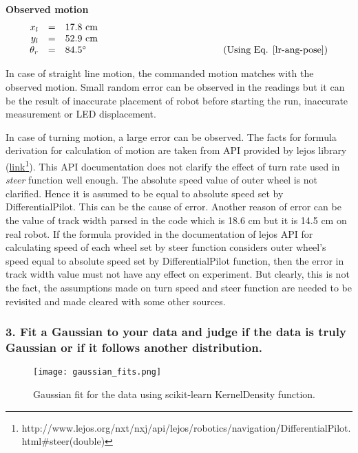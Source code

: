 \begin{enumerate}
	\textbf{Observed motion}
	\begin{equation}
	\begin{array}{rcl}
	x_{l} &=& 17.8 \text{ cm} \\
	y_{l} &=& 52.9 \text{ cm} \\
	\theta_r &=& 84.5^{\circ} \hspace{5cm} \text{(Using Eq. \ref{lr-ang-pose})}
	\end{array}
	\end{equation}
	
	
\end{enumerate}

In case of straight line motion, the commanded motion matches with the observed motion. Small random error can be observed in the readings but it can be the result of inaccurate placement of robot before starting the run, inaccurate measurement or LED displacement. 

In case of turning motion, a large error can be observed. The facts for formula derivation for calculation of motion are taken from API provided by lejos library (\href{http://www.lejos.org/nxt/nxj/api/lejos/robotics/navigation/DifferentialPilot.html#steer(double)}{link}\footnote{http://www.lejos.org/nxt/nxj/api/lejos/robotics/navigation/DifferentialPilot.html$\#$steer(double)}). This API documentation does not clarify the effect of turn rate used in \textit{steer} function well enough. The absolute speed value of outer wheel is not clarified. Hence it is assumed to be equal to absolute speed set by DifferentialPilot. This can be the cause of error.
Another reason of error can be the value of track width parsed in the code which is 18.6 cm but it is 14.5 cm on real robot.
If the formula provided in the documentation of lejos API for calculating speed of each wheel set by steer function considers outer wheel's speed equal to absolute speed set by DifferentialPilot function, then the error in track width value must not have any effect on experiment. But clearly, this is not the fact, the assumptions made on turn speed and steer function are needed to be revisited and made cleared with some other sources.      

\newpage
\subsubsection*{3. Fit a Gaussian to your data and judge if the data is truly Gaussian or if it follows another distribution.}

\begin{figure}[ht]
\centering
\texttt{[image: gaussian\_fits.png]}
\caption{Gaussian fit for the data using scikit-learn KernelDensity function. }
\label{gaussian}
\end{figure}


